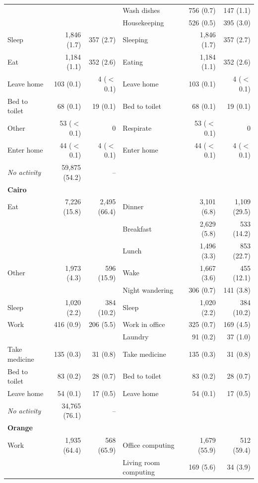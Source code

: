 \begin{tabular}{l rr l rr}
 &  &  & Wash dishes & 756 (0.7) & 147 (1.1) \\
 &  &  & Housekeeping & 526 (0.5) & 395 (3.0) \\
Sleep & 1{,}846 (1.7) & 357 (2.7) & Sleeping & 1{,}846 (1.7) & 357 (2.7) \\
Eat & 1{,}184 (1.1) & 352 (2.6) & Eating & 1{,}184 (1.1) & 352 (2.6) \\
Leave home & 103 (0.1) & 4 ($<$0.1) & Leave home & 103 (0.1) & 4 ($<$0.1) \\
Bed to toilet & 68 (0.1) & 19 (0.1) & Bed to toilet & 68 (0.1) & 19 (0.1) \\
Other & 53 ($<$0.1) & 0 & Respirate & 53 ($<$0.1) & 0 \\
Enter home & 44 ($<$0.1) & 4 ($<$0.1) & Enter home & 44 ($<$0.1) & 4 ($<$0.1) \\
\textit{No activity} & 59{,}875 (54.2) & -- &  &  &  \\
\midrule
\multicolumn{6}{l}{\textbf{Cairo}} \\
Eat & 7{,}226 (15.8) & 2{,}495 (66.4) & Dinner & 3{,}101 (6.8) & 1{,}109 (29.5) \\
 &  &  & Breakfast & 2{,}629 (5.8) & 533 (14.2) \\
 &  &  & Lunch & 1{,}496 (3.3) & 853 (22.7) \\
Other & 1{,}973 (4.3) & 596 (15.9) & Wake & 1{,}667 (3.6) & 455 (12.1) \\
 &  &  & Night wandering & 306 (0.7) & 141 (3.8) \\
Sleep & 1{,}020 (2.2) & 384 (10.2) & Sleep & 1{,}020 (2.2) & 384 (10.2) \\
Work & 416 (0.9) & 206 (5.5) & Work in office & 325 (0.7) & 169 (4.5) \\
 &  &  & Laundry & 91 (0.2) & 37 (1.0) \\
Take medicine & 135 (0.3) & 31 (0.8) & Take medicine & 135 (0.3) & 31 (0.8) \\
Bed to toilet & 83 (0.2) & 28 (0.7) & Bed to toilet & 83 (0.2) & 28 (0.7) \\
Leave home & 54 (0.1) & 17 (0.5) & Leave home & 54 (0.1) & 17 (0.5) \\
\textit{No activity} & 34{,}765 (76.1) & -- &  &  &  \\
\midrule
\multicolumn{6}{l}{\textbf{Orange}} \\
Work & 1{,}935 (64.4) & 568 (65.9) & Office computing & 1{,}679 (55.9) & 512 (59.4) \\
 &  &  & Living room computing & 169 (5.6) & 34 (3.9) \\

\end{tabular}
